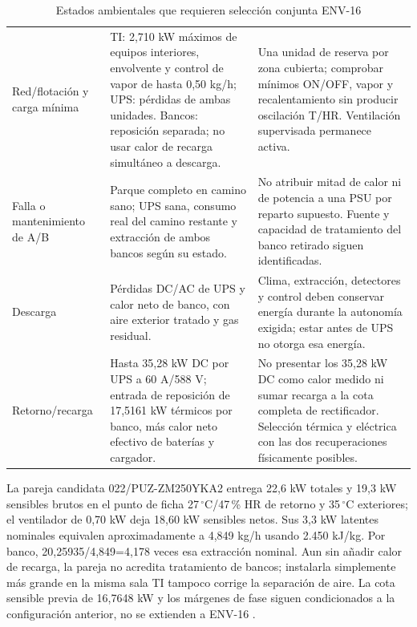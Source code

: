 \begin{table}[htbp]
\centering\small
\caption{Estados ambientales que requieren selección conjunta ENV-16}\label{tab:sd4-env16-estados}
\begin{tabularx}{\linewidth}{L{27mm}X X}
\hline
{} &  &  \\ \hline
Red/flotación y carga mínima & TI: 2,710 kW máximos de equipos interiores, envolvente y control de vapor de hasta 0,50 kg/h; UPS: pérdidas de ambas unidades. Bancos: reposición separada; no usar calor de recarga simultáneo a descarga. & Una unidad de reserva por zona cubierta; comprobar mínimos ON/OFF, vapor y recalentamiento sin producir oscilación T/HR. Ventilación supervisada permanece activa. \\ \hline
Falla o mantenimiento de A/B & Parque completo en camino sano; UPS sana, consumo real del camino restante y extracción de ambos bancos según su estado. & No atribuir mitad de calor ni de potencia a una PSU por reparto supuesto. Fuente y capacidad de tratamiento del banco retirado siguen identificadas. \\ \hline
Descarga & Pérdidas DC/AC de UPS y calor neto de banco, con aire exterior tratado y gas residual. & Clima, extracción, detectores y control deben conservar energía durante la autonomía exigida; estar antes de UPS no otorga esa energía. \\ \hline
Retorno/recarga & Hasta 35,28 kW DC por UPS a 60 A/588 V; entrada de reposición de 17,5161 kW térmicos por banco, más calor neto efectivo de baterías y cargador. & No presentar los 35,28 kW DC como calor medido ni sumar recarga a la cota completa de rectificador. Selección térmica y eléctrica con las dos recuperaciones físicamente posibles. \\ \hline
\end{tabularx}
\end{table}

La pareja candidata 022/PUZ-ZM250YKA2 entrega 22,6 kW totales y 19,3 kW sensibles brutos en el punto de ficha 27\,$^{\circ}$C/47\,\% HR de retorno y 35\,$^{\circ}$C exteriores; el ventilador de 0,70 kW deja 18,60 kW sensibles netos. Sus 3,3 kW latentes nominales equivalen aproximadamente a 4,849 kg/h usando 2.450 kJ/kg. Por banco, 20,25935/4,849=4,178 veces esa extracción nominal. Aun sin añadir calor de recarga, la pareja no acredita tratamiento de bancos; instalarla simplemente más grande en la misma sala TI tampoco corrige la separación de aire. La cota sensible previa de 16,7648 kW y los márgenes de fase siguen condicionados a la configuración anterior, no se extienden a ENV-16 \parencite[p.~3]{p6-mext-pi-2025}.

